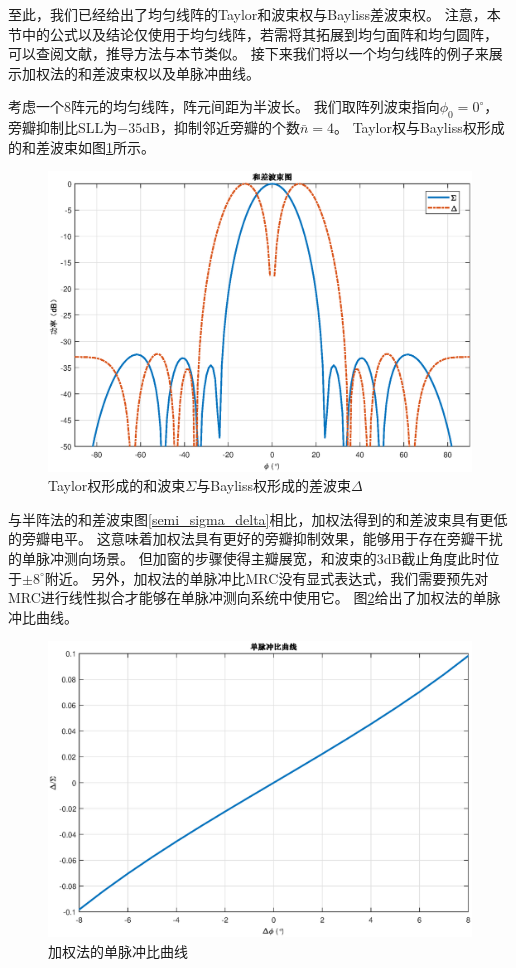 \documentclass[master]{thesis-uestc}
\begin{document}
至此，我们已经给出了均匀线阵的Taylor和波束权与Bayliss差波束权。
注意，本节中的公式以及结论仅使用于均匀线阵，若需将其拓展到均匀面阵和均匀圆阵，
可以查阅文献\cite{Taylor,Bayliss}，推导方法与本节类似。
接下来我们将以一个均匀线阵的例子来展示加权法的和差波束权以及单脉冲曲线。

考虑一个$8$阵元的均匀线阵，阵元间距为半波长。
我们取阵列波束指向$\phi_0=0^\circ$，旁瓣抑制比SLL为$-35$dB，抑制邻近旁瓣的个数$\bar{n}=4$。
Taylor权与Bayliss权形成的和差波束如图\ref{Taylor_Bayliss}所示。
\begin{figure}[H]
    \includegraphics[scale=0.5]{pic/Taylor_Bayliss.eps}
    \caption{Taylor权形成的和波束$\Sigma$与Bayliss权形成的差波束$\Delta$}
    \label{Taylor_Bayliss}
\end{figure}

与半阵法的和差波束图\ref{semi_sigma_delta}相比，加权法得到的和差波束具有更低的旁瓣电平。
这意味着加权法具有更好的旁瓣抑制效果，能够用于存在旁瓣干扰的单脉冲测向场景。
但加窗的步骤使得主瓣展宽，和波束的3dB截止角度此时位于$\pm8^\circ$附近。
另外，加权法的单脉冲比MRC没有显式表达式，我们需要预先对MRC进行线性拟合才能够在单脉冲测向系统中使用它。
图\ref{Taylor_Bayliss_MRC}给出了加权法的单脉冲比曲线。
\begin{figure}[H]
    \includegraphics[scale=0.5]{pic/Taylor_Bayliss_MRC.eps}
    \caption{加权法的单脉冲比曲线}
    \label{Taylor_Bayliss_MRC}
\end{figure}
\end{document}
